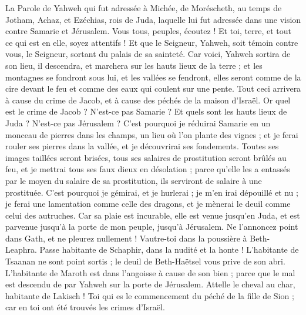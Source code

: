 \begin{multicols}{2}
\VerseOne{}La Parole de Yahweh qui fut adressée à Michée, de Moréscheth, au temps de Jotham, Achaz, et Ezéchias, rois de Juda, laquelle lui fut adressée dans une vision contre Samarie et Jérusalem.
Vous tous, peuples, écoutez ! Et toi, terre, et tout ce qui est en elle, soyez attentifs ! Et que le Seigneur, Yahweh, soit témoin contre vous, le Seigneur, sortant du palais de sa sainteté.
Car voici, Yahweh sortira de son lieu, il descendra, et marchera sur les hauts lieux de la terre ;
et les montagnes se fondront sous lui, et les vallées se fendront, elles seront comme de la cire devant le feu et comme des eaux qui coulent sur une pente.
Tout ceci arrivera à cause du crime de Jacob, et à cause des péchés de la maison d'Israël. Or quel est le crime de Jacob ? N'est-ce pas Samarie ? Et quels sont les hauts lieux de Juda ? N'est-ce pas Jérusalem ?
C'est pourquoi je réduirai Samarie en un monceau de pierres dans les champs, un lieu où l'on plante des vignes ; et je ferai rouler ses pierres dans la vallée, et je découvrirai ses fondements.
Toutes ses images taillées seront brisées, tous ses salaires de prostitution seront brûlés au feu, et je mettrai tous ses faux dieux en désolation ; parce qu'elle les a entassés par le moyen du salaire de sa prostitution, ils serviront de salaire à une prostituée.
C'est pourquoi je gémirai, et je hurlerai ; je m'en irai dépouillé et nu ; je ferai une lamentation comme celle des dragons, et je mènerai le deuil comme celui des autruches.
Car sa plaie est incurable, elle est venue jusqu'en Juda, et est parvenue jusqu'à la porte de mon peuple, jusqu'à Jérusalem.
Ne l'annoncez point dans Gath, et ne pleurez nullement ! Vautre-toi dans la poussière à Beth-Leaphra.
Passe habitante de Schaphir, dans la nudité et la honte ! L'habitante de Tsaanan ne sont point sortis ; le deuil de Beth-Haëtsel vous prive de son abri.
L'habitante de Maroth est dans l'angoisse à cause de son bien ; parce que le mal est descendu de par Yahweh sur la porte de Jérusalem.
Attelle le cheval au char, habitante de Lakisch ! Toi qui es le commencement du péché de la fille de Sion ; car en toi ont été trouvés les crimes d'Israël.

\end{multicols}
